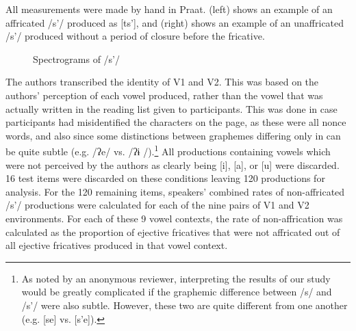 \documentclass[output=paper,newtxmath,modfonts,nonflat,final]{langsci/langscibook}
\begin{document}
All measurements were made by hand in Praat.  (left) shows an example of an affricated /s’/ produced as [ts’], and  (right) shows an example of an unaffricated /s’/ produced without a period of closure before the fricative.        
 

\begin{figure}
\quad
{}
\caption{Spectrograms of /s’/}
\label{fig:moeng:2}
\end{figure}

The authors transcribed the identity of V1 and V2. This was based on the authors’ perception of each vowel produced, rather than the vowel that was actually written in the reading list given to participants. This was done in case participants had misidentified the characters on the page, as these were all nonce words, and also since some distinctions between graphemes differing only in  can be quite subtle (e.g.  /ʔe/ vs.  /ʔɨ /).\footnote{As noted by an anonymous reviewer, interpreting the results of our study would be greatly complicated if the graphemic difference between /s/ and /s’/ were also subtle. However, these two are quite different from one another (e.g.  [se] vs.  [s’e]).} All productions containing vowels which were not perceived by the authors as clearly being [i], [a], or [u] were discarded. 16 test items were discarded on these conditions leaving 120 productions for analysis. For the 120 remaining items, speakers’ combined rates of non-affricated /s’/ productions were calculated for each of the nine pairs of V1 and V2 environments. For each of these 9 vowel contexts, the rate of non-affrication was calculated as the proportion of ejective fricatives that were not affricated out of all ejective fricatives produced in that vowel context.
\end{document}
